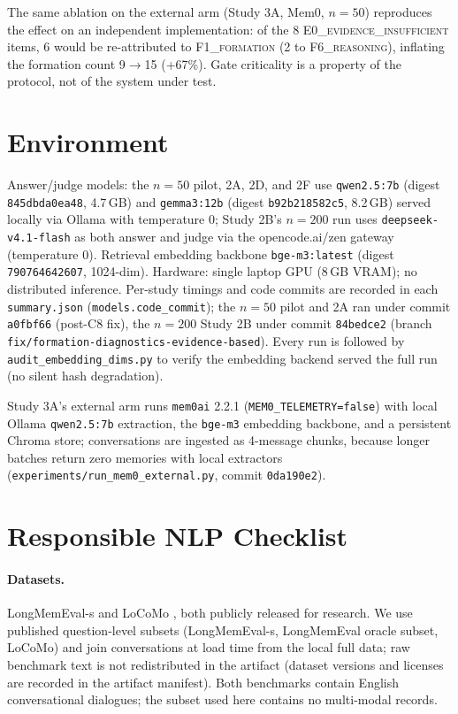 \documentclass[11pt]{article}
\newcommand{\fone}{F1\textsc{\_formation}}
\newcommand{\fsix}{F6\textsc{\_reasoning}}
\newcommand{\ezero}{E0\textsc{\_evidence\_insufficient}}
\begin{document}
The same ablation on the external arm (Study 3A, Mem0, $n{=}50$)
reproduces the effect on an independent implementation: of the 8
\ezero{} items, 6 would be re-attributed to \fone{} (2 to \fsix{}),
inflating the formation count 9$\to$15 (+67\%). Gate criticality is a
property of the protocol, not of the system under test.

\section{Environment}
\label{app:env}

Answer/judge models: the $n{=}50$ pilot, 2A, 2D, and 2F use
\texttt{qwen2.5:7b} (digest \texttt{845dbda0ea48}, 4.7\,GB) and
\texttt{gemma3:12b} (digest \texttt{b92b218582c5}, 8.2\,GB) served locally
via Ollama with temperature 0; Study 2B's $n{=}200$ run uses
\texttt{deepseek-v4.1-flash} as both answer and judge via the
opencode.ai/zen gateway (temperature 0). Retrieval embedding backbone
\texttt{bge-m3:latest} (digest \texttt{790764642607}, 1024-dim). Hardware:
single laptop GPU (8\,GB VRAM); no distributed inference. Per-study
timings and code commits are recorded in each \verb|summary.json|
(\verb|models.code_commit|); the $n{=}50$ pilot and 2A ran under commit
\texttt{a0fbf66} (post-C8 fix), the $n{=}200$ Study 2B under commit
\texttt{84bedce2} (branch \texttt{fix/formation-diagnostics-evidence-based}).
Every run is followed by \texttt{audit\_embedding\_dims.py}
to verify the embedding backend served the full run (no silent hash
degradation).

Study 3A's external arm runs \texttt{mem0ai} 2.2.1
(\texttt{MEM0\_TELEMETRY=false}) with local Ollama \texttt{qwen2.5:7b}
extraction, the \texttt{bge-m3} embedding backbone, and a persistent
Chroma store; conversations are ingested as 4-message chunks, because
longer batches return zero memories with local extractors
(\texttt{experiments/run\_mem0\_external.py}, commit \texttt{0da190e2}).

\section*{Responsible NLP Checklist}

\paragraph{Datasets.} LongMemEval-s \cite{longmemeval} and LoCoMo
\cite{locomo}, both publicly released for research. We use published
question-level subsets (LongMemEval-s, LongMemEval oracle subset, LoCoMo)
and join conversations at load time from the local full data; raw
benchmark text is not redistributed in the artifact (dataset versions and
licenses are recorded in the artifact manifest). Both benchmarks contain
English conversational dialogues; the subset used here contains no
multi-modal records.
\end{document}
